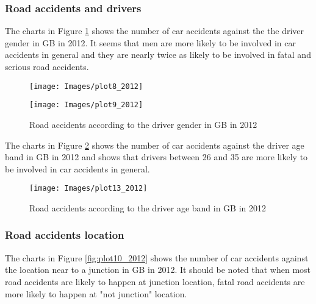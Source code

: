 \documentclass{article}
\begin{document}





\subsubsection*{Road accidents and drivers}
The charts in Figure \ref{fig:plot8_2012} shows the number of car accidents against the the driver gender in GB in 2012.
It seems that men are more likely to be involved in car accidents in general and they are nearly twice as likely to be involved in fatal and serious road accidents.
 

\begin{figure}[H]
\hspace{-1cm}
\vspace{-0.5cm}
\begin{minipage}[b]{.46\linewidth}
  \centering
    \texttt{[image: Images/plot8\_2012]}
\end{minipage}
\hspace{1cm}
\begin{minipage}[b]{0.46\linewidth}
  \centering
     \texttt{[image: Images/plot9\_2012]}
\end{minipage}
\caption{Road accidents according to the driver gender in GB in 2012 }  
 \label{fig:plot8_2012}
 \end{figure}
 
The charts in Figure \ref{fig:plot13_2012} shows the number of car accidents against the driver age band in GB in 2012 and shows that 
drivers between 26 and 35 are more likely to be involved in car accidents in general.
 
\begin{figure}[H]
  \centering
  \texttt{[image: Images/plot13\_2012]}
  \caption{Road accidents according to the driver age band in GB in 2012 }
  \label{fig:plot13_2012}
\end{figure} 
 
 
\subsubsection*{Road accidents location}

The charts in Figure \ref{fig:plot10_2012} shows the number of car accidents against the location near to a junction in GB in 2012. It should be noted that when most road accidents are likely to happen at junction location, fatal road accidents are more likely to happen at "not junction" location.
\end{document}
